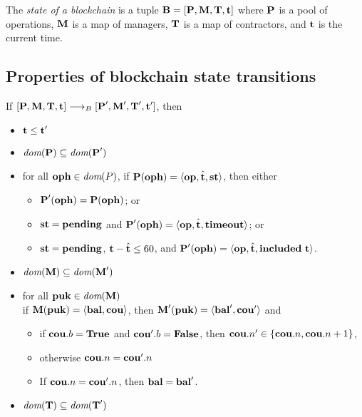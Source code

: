 \documentclass[a4paper]{llncs}
\begin{document}
\begin{definition}%
  The \emph{state of a blockchain} is a tuple
  $\textbf{B} = [\textbf{P}, \textbf{M}, \textbf{T}, \textbf{t}]$ where
  $\textbf{P}$ is a pool of operations, $\textbf{M}$ is a map of managers,
  $\textbf{T}$ is a map of contractors, and $\textbf{t}$ is the current
  time. 
\end{definition}
\clearpage{}
\subsection{Properties of blockchain state transitions}

If $[\textbf{P}, \textbf{M}, \textbf{T}, \textbf{t}] \stackrel{{}}\longrightarrow_B{}
[\textbf{P}', \textbf{M}', \textbf{T}', \textbf{t}']$, then
\begin{itemize}
\item $\textbf{t} \le \textbf{t}'$
\item $\textit{dom} (\textbf{P}) \subseteq \textit{dom}(\textbf{P}')$
\item for all $\textbf{oph} \in \textit{dom}(P)$, if 
  $\textbf{P} (\textbf{oph}) = \langle\textbf{op},  \hat{\textbf{t}}, \textbf{st}\rangle$, then either
  \begin{itemize}
  \item     $\textbf{P}'    (\textbf{oph}) = \textbf{P} (\textbf{oph})$; or
  \item $\textbf{st}  = \textbf{pending}$ and $\textbf{P}' (\textbf{oph}) =
    \langle\textbf{op}, \hat{\textbf{t}}, \textbf{timeout}\rangle$; or
  \item  $\textbf{st}  = \textbf{pending}$, $\textbf{t} - \hat{\textbf{t}}
    \le 60 $, and
    $\textbf{P}' (\textbf{oph}) =       \langle\textbf{op}, \hat{\textbf{t}}, \textbf{included}\
      \textbf{t}\rangle$.
  \end{itemize}
    
 \item $ \textit{dom} (\textbf{M}) \subseteq \textit{dom} (\textbf{M}')$
 \item for all $\textbf{puk} \in \textit{dom} (\textbf{M})$\\
   if $\textbf{M} (\textbf{puk}) =
   \langle\textbf{bal}, \textbf{cou}\rangle$, 
   then $\textbf{M}' (\textbf{puk}) =
   \langle\textbf{bal}', \textbf{cou}'\rangle$ and
   \begin{itemize}
   \item if $\textbf{cou}.b=\textbf{True}$ and $\textbf{cou}'.b=\textbf{False}$, then $\textbf{cou}.n' \in \{
     \textbf{cou}.n,  \textbf{cou}.n+1\}$,
   \item otherwise $\textbf{cou}.n = \textbf{cou}'.n$
   \item If $\textbf{cou}.n = \textbf{cou}'.n$, then $\textbf{bal} = \textbf{bal}'$.
   \end{itemize}

 \item $ \textit{dom} (\textbf{T}) \subseteq \textit{dom} (\textbf{T}')$
\end{itemize}
\end{document}
